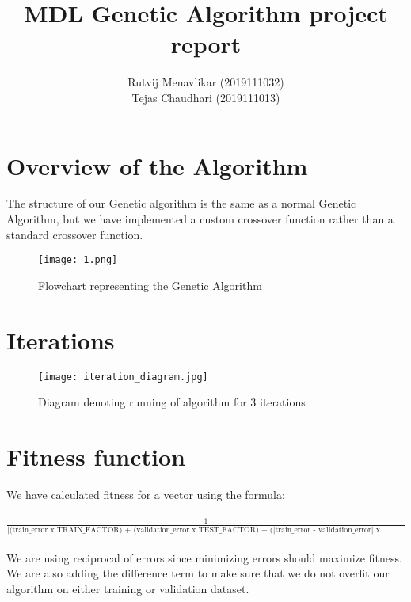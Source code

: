 \documentclass[10pt]{report}
\title{MDL Genetic Algorithm project report}
\author{Rutvij Menavlikar (2019111032) \\ Tejas Chaudhari (2019111013)}
\theoremstyle{definition}
\theoremstyle{plain}
\begin{document}
\begin{titlepage} 
    \maketitle{}
\end{titlepage}

\section*{Overview of the Algorithm}
The structure of our Genetic algorithm is the same as a normal Genetic Algorithm, but we have implemented a custom crossover function rather than a standard crossover function. \\
\begin{figure}[h]
\centering
\texttt{[image: 1.png]}
\caption{Flowchart representing the Genetic Algorithm}
\end{figure}
\section*{Iterations}
\begin{figure}[htp]
\centering
\texttt{[image: iteration\_diagram.jpg]}
\caption{Diagram denoting running of algorithm for 3 iterations}
\end{figure}
\pagebreak



\section*{Fitness function}
We have calculated fitness for a vector using the formula: \\ \\
$\frac{1}{\text{|(train\_error x TRAIN\_FACTOR) + (validation\_error x TEST\_FACTOR) + (|train\_error - validation\_error| x DIFF\_FACTOR) |}}$ \\ \\

We are using reciprocal of errors since minimizing errors should maximize fitness. We are also adding the difference term to make sure that we do not overfit our algorithm on either training or validation dataset.
\end{document}

